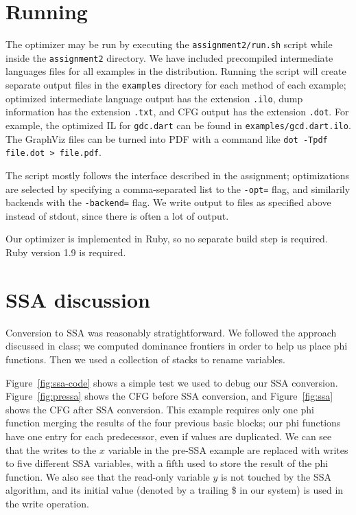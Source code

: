 \documentclass[10pt,twocolumn]{article}
\begin{document}
\section{Running}

The optimizer may be run by executing the \texttt{assignment2/run.sh}
script while inside the \texttt{assignment2} directory. We have
included precompiled intermediate languages files for all examples in
the distribution. Running the script will create separate output files
in the \texttt{examples} directory for each method of each example;
optimized intermediate language output has the extension
\texttt{.ilo}, dump information has the extension \texttt{.txt}, and
CFG output has the extension \texttt{.dot}. For example, the optimized
IL for \texttt{gdc.dart} can be found in
\texttt{examples/gcd.dart.ilo}. The GraphViz files can be turned into
PDF with a command like \texttt{dot -Tpdf file.dot > file.pdf}.

The script mostly follows the interface described in the assignment;
optimizations are selected by specifying a comma-separated list to the
\texttt{-opt=} flag, and similarily backends with the
\texttt{-backend=} flag. We write output to files as specified above
instead of stdout, since there is often a lot of output.

Our optimizer is implemented in Ruby, so no separate build step is
required. Ruby version 1.9 is required. 

\section{SSA discussion}

Conversion to SSA was reasonably stratightforward. We followed the
approach discussed in class; we computed dominance frontiers in order
to help us place phi functions. Then we used a collection of stacks to
rename variables.

Figure~\ref{fig:ssa-code} shows a simple test we used to debug our SSA
conversion. Figure~\ref{fig:pressa} shows the CFG before SSA
conversion, and Figure~\ref{fig:ssa} shows the CFG after SSA
conversion. This example requires only one phi function merging the
results of the four previous basic blocks; our phi functions have one
entry for each predecessor, even if values are duplicated. We can see
that the writes to the $x$ variable in the pre-SSA example are
replaced with writes to five different SSA variables, with a fifth
used to store the result of the phi function. We also see that the
read-only variable $y$ is not touched by the SSA algorithm, and its
initial value (denoted by a trailing \$ in our system) is used in the
write operation.
\end{document}
